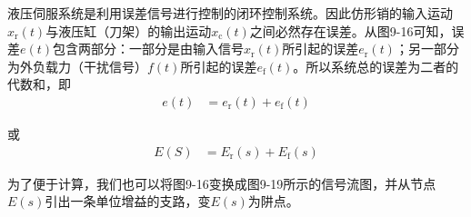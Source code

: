 液压伺服系统是利用误差信号进行控制的闭环控制系统。因此仿形销的输入运动$x_{\text{r}}(t)$与液压缸（刀架）的输出运动$x_{\text{c}}(t)$之间必然存在误差。从图9-16可知，误差$e(t)$包含两部分：一部分是由输入信号$x_{\text{r}}(t)$所引起的误差$e_{\text{r}}(t)$；另一部分为外负载力（干扰信号）$f(t)$所引起的误差$e_{\text{f}}(t)$。所以系统总的误差为二者的代数和，即
\begin{align*}
    e(t)&=e_{\text{r}}(t)+e_{\text{f}}(t)
\end{align*}

\noindent 或
\begin{align}
    E(S)&=E_{\text{r}}(s)+E_{\text{f}}(s)
\end{align}

\noindent 为了便于计算，我们也可以将图9-16变换成图9-19所示的信号流图，并从节点$E(s)$引出一条单位增益的支路，变$E(s)$为阱点。